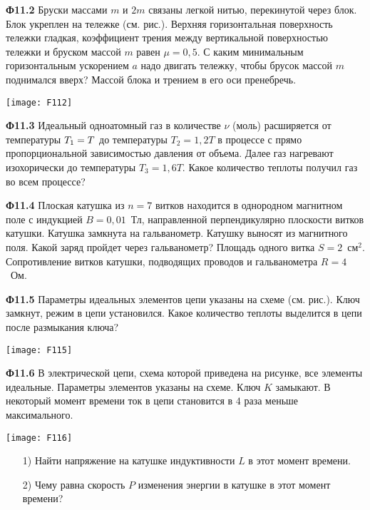 \documentclass[12pt, a4paper, usenames]{article}
\newcommand*{\hm}[1]{#1\nobreak\discretionary{}%
{\hbox{$\mathsurround=0pt #1$}}{}}
\begin{document}
\parbox[b][3.4cm][t]{130mm}{{\bf Ф11.2} Бруски массами $m$ и $2m$ связаны легкой нитью, перекинутой через блок. Блок укреплен на тележке (см. рис.). Верхняя горизонтальная поверхность тележки гладкая, коэффициент трения между вертикальной поверхностью тележки и бруском массой $m$ равен $\mu = 0{,}5$. С каким минимальным горизонтальным ускорением $a$ надо двигать тележку, чтобы брусок массой $m$ поднимался вверх? Массой блока и трением в его оси пренебречь.}
\hfill
\parbox[b][3.4cm][t]{50mm}{
\texttt{[image: F112]}} 

\bigskip

{\bf Ф11.3} Идеальный одноатомный газ в количестве $\nu$ (моль) расширяется от температуры $T_1\hm=T$ до температуры $T_2=1{,}2T$ в процессе с прямо пропорциональной зависимостью давления от объема. Далее газ нагревают изохорически до температуры $T_3=1{,}6T$. Какое количество теплоты получил газ во всем процессе?

\bigskip

{\bf Ф11.4} Плоская катушка из $n=7$ витков находится в однородном магнитном поле с индукцией $B = 0{,}01$~Тл, направленной перпендикулярно плоскости витков катушки. Катушка замкнута на гальванометр. Катушку выносят из магнитного поля. Какой заряд пройдет через гальванометр? Площадь одного витка $S = 2$~см$^2$. Сопротивление витков катушки, подводящих проводов и гальванометра $R = 4$~Ом. 

\bigskip

\parbox[b][4cm][t]{135mm}{{\bf Ф11.5} Параметры идеальных элементов цепи указаны на схеме (см. рис.). Ключ замкнут, режим в цепи установился. Какое количество теплоты выделится в цепи после размыкания ключа?}
\hfill
\parbox[b][4cm][t]{45mm}{
\texttt{[image: F115]}} 

\bigskip

\parbox[b][2cm][t]{130mm}{{\bf Ф11.6} В электрической цепи, схема которой приведена на рисунке, все элементы идеальные. Параметры элементов указаны на схеме. Ключ $K$ замыкают. В некоторый момент времени ток в цепи становится в $4$ раза меньше максимального.}
\hfill
\parbox[b][2cm][t]{50mm}{
\texttt{[image: F116]}} 
\begin{itemize}
\item[1)] Найти напряжение на катушке индуктивности $L$ в этот момент времени.
\item[2)] Чему равна скорость $P$ изменения энергии в катушке в этот момент времени?
\end{itemize}
\end{document}
